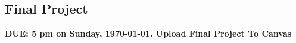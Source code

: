 \AdvanceDate[3]

\vspace{2em}

\subsection{Final Project} \textbf{DUE: 5 pm on Sunday, \today. Upload Final Project To Canvas}

\vspace{2em}















